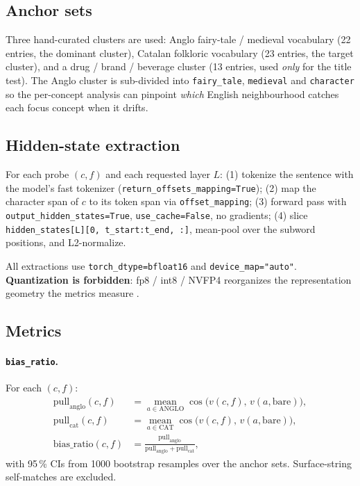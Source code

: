 \documentclass[10pt,twocolumn,a4paper]{article}
\newcommand{\code}[1]{\texttt{\small #1}}
\begin{document}
\subsection{Anchor sets}

Three hand-curated clusters are used: Anglo fairy-tale / medieval vocabulary
(22 entries, the dominant cluster), Catalan folkloric vocabulary (23 entries,
the target cluster), and a drug / brand / beverage cluster (13 entries, used
\emph{only} for the title test). The Anglo cluster is sub-divided into
\code{fairy\_tale}, \code{medieval} and \code{character} so the per-concept
analysis can pinpoint \emph{which} English neighbourhood catches each focus
concept when it drifts.

\subsection{Hidden-state extraction}\label{sec:extraction}

For each probe $(c,f)$ and each requested layer $L$: (1) tokenize the sentence
with the model's fast tokenizer (\code{return\_offsets\_mapping=True}); (2) map
the character span of $c$ to its token span via \code{offset\_mapping}; (3)
forward pass with \code{output\_hidden\_states=True}, \code{use\_cache=False},
no gradients; (4) slice \code{hidden\_states[L][0, t\_start:t\_end, :]},
mean-pool over the subword positions, and L2-normalize.

All extractions use \code{torch\_dtype=bfloat16} and
\code{device\_map="auto"}. \textbf{Quantization is forbidden}: fp8 / int8 /
NVFP4 reorganizes the representation geometry the metrics measure
\citep{dettmers2022}.

\subsection{Metrics}

\paragraph{\code{bias\_ratio}.} For each $(c,f)$:
\begin{align}
  \text{pull}_{\text{anglo}}(c,f)   &= \!\!\operatorname*{mean}_{a\in\text{ANGLO}}\!\! \cos\!\big(v(c,f),\,v(a,\text{bare})\big),\\
  \text{pull}_{\text{cat}}(c,f) &= \!\!\operatorname*{mean}_{a\in\text{CAT}}\!\! \cos\!\big(v(c,f),\,v(a,\text{bare})\big),\\
  \text{bias\_ratio}(c,f) &= \frac{\text{pull}_{\text{anglo}}}{\text{pull}_{\text{anglo}} + \text{pull}_{\text{cat}}},
\end{align}
with 95\,\% CIs from 1000 bootstrap resamples over the anchor sets.
Surface-string self-matches are excluded.
\end{document}
